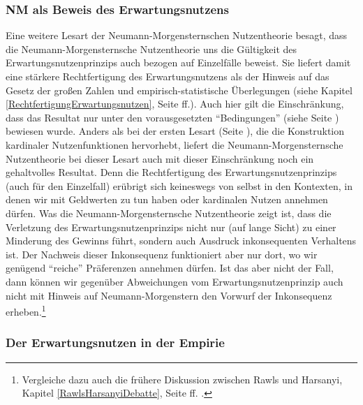 \subsubsection{NM als Beweis des Erwartungsnutzens}

Eine weitere Lesart der Neumann-Morgensternschen Nutzentheorie besagt, dass die
Neumann-Mor\-gen\-sternsche Nutzentheorie uns die Gültigkeit des
Erwartungsnutzenprinzips auch bezogen auf Einzelfälle beweist. Sie liefert damit
eine stärkere Rechtfertigung des Erwartungsnutzens als der Hinweis auf das Gesetz
der großen Zahlen und empirisch-statistische Überlegungen (siehe Kapitel
\ref{RechtfertigungErwartungsnutzen}, Seite
\pageref{RechtfertigungErwartungsnutzen}ff.). Auch hier gilt die Einschränkung,
dass das Resultat nur unter den vorausgesetzten "`Bedingungen"' (siehe Seite
\pageref{LotterienBedingungen}) bewiesen wurde. Anders als bei der ersten Lesart
(Seite \pageref{LesartKardinalerNutzen}), die die Konstruktion kardinaler
Nutzenfunktionen hervorhebt, liefert die Neumann-Morgensternsche Nutzentheorie
bei dieser Lesart auch mit dieser Einschränkung noch ein gehaltvolles Resultat.
Denn die Rechtfertigung des Erwartungsnutzenprinzips (auch für den Einzelfall)
erübrigt sich keineswegs von selbst in den Kontexten, in denen wir mit Geldwerten
zu tun haben oder kardinalen Nutzen annehmen dürfen. 
 Was
die Neumann-Morgensternsche Nutzentheorie zeigt ist, dass die Verletzung des
Erwartungsnutzenprinzips nicht nur (auf lange Sicht) zu einer Minderung des
Gewinns führt, sondern auch Ausdruck inkonsequenten Verhaltens ist. Der Nachweis
dieser Inkonsequenz funktioniert aber nur dort, wo wir genügend "`reiche"'
Präferenzen annehmen dürfen. Ist das aber nicht der Fall, dann können wir
gegenüber Abweichungen vom Erwartungsnutzenprinzip auch nicht mit Hinweis auf
Neumann-Morgenstern den Vorwurf der Inkonsequenz erheben.\footnote{Vergleiche
dazu auch die frühere Diskussion zwischen Rawls und Harsanyi, Kapitel
\ref{RawlsHarsanyiDebatte}, Seite \pageref{RawlsHarsanyiDebatte}ff. .}

\subsubsection{Der Erwartungsnutzen in der Empirie}

